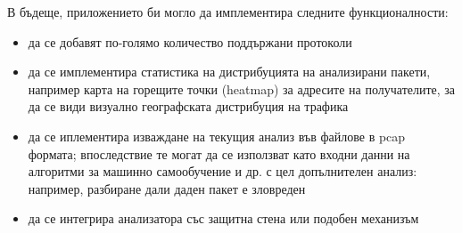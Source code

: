 \documentclass[12pt,a4paper,oneside]{book}
\begin{document}
В бъдеще, приложението би могло да имплементира следните функционалности:

\begin{itemize}
  \item
  да се добавят по-голямо количество поддържани протоколи
\item
  да се имплементира статистика на дистрибуцията на анализирани пакети,
  например карта на горещите точки (heatmap) за адресите на получателите, за
  да се види визуално географската дистрибуция на трафика
\item
  да се иплементира изваждане на текущия анализ във файлове в pcap формата;
  впоследствие те могат да се използват като входни данни на алгоритми за
  машинно самообучение и др. с цел допълнителен анализ: например, разбиране
  дали даден пакет е зловреден
\item
  да се интегрира анализатора със защитна стена или подобен механизъм
\end{itemize}




\listoffigures
\end{document}
